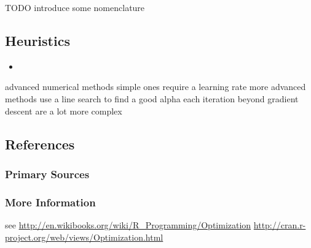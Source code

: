\begin{bibunit}
TODO introduce some nomenclature

\subsection{Heuristics}

\begin{itemize}
	\item 
\end{itemize}


advanced numerical methods
simple ones require a learning rate
more advanced methods use a line search to find a good alpha each iteration
beyond gradient descent are a lot more complex



\subsection{References}

\subsubsection{Primary Sources}


\subsubsection{More Information}


see
\url{http://en.wikibooks.org/wiki/R_Programming/Optimization}
\url{http://cran.r-project.org/web/views/Optimization.html}


\putbib
\end{bibunit}

